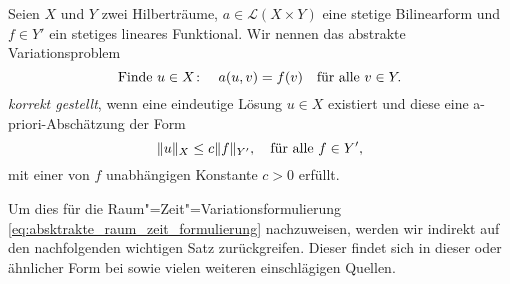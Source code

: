 \begin{Definition}[Hadamard]
\label{definition:sachgemaess_gestellt_nach_hadamard}
    Seien $X$ und $Y$ zwei Hilberträume, $a \in \mathcal L(X \times Y)$ eine stetige Bilinearform und $f \in Y'$ ein stetiges lineares Funktional.
    Wir nennen das abstrakte Variationsproblem
    \begin{equation}
    \label{eq:hadamard_variationsproblem}
        \text{Finde } u \in X \colon \quad a(u, v) = f(v) \quad \fa v \in Y.
    \end{equation}
    \emph{korrekt gestellt}, wenn eine eindeutige Lösung $u \in X$ existiert und diese eine a-priori-Abschätzung der Form
    \begin{equation}
    \label{eq:hadamard_abschaetzung}
        \norm{u}_{X} \leq c \norm{f}_{Y'}, \quad \fa f \in Y',
    \end{equation}
    mit einer von $f$ unabhängigen Konstante $c > 0$ erfüllt.
\end{Definition}

Um dies für die Raum"=Zeit"=Variationsformulierung \cref{eq:absktrakte_raum_zeit_formulierung} nachzuweisen, werden wir indirekt auf den nachfolgenden wichtigen Satz zurückgreifen.
Dieser findet sich in dieser oder ähnlicher Form bei \textcites[Theorem 2.1]{Babuska:1971fx}[Theorem 5.2.1]{Aziz:2014wf}[Theorem \S{}3.3.6]{Braess:2007wm} sowie vielen weiteren einschlägigen Quellen.

